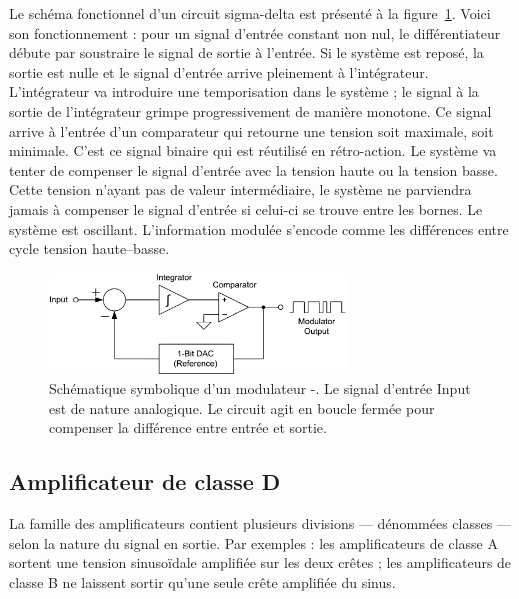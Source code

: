 \documentclass[10pt, oneside, a4paper]{article}
\begin{document}
Le schéma fonctionnel d'un circuit sigma-delta est présenté à la figure~\ref{fig:sigmaDelta}.
Voici son fonctionnement :
pour un signal d'entrée constant non nul, le différentiateur débute par soustraire le signal de sortie à l'entrée.
Si le système est reposé, la sortie est nulle et le signal d'entrée arrive pleinement à l'intégrateur.
L'intégrateur va introduire une temporisation dans le système ;
le signal à la sortie de l'intégrateur grimpe progressivement de manière monotone.
Ce signal arrive à l'entrée d'un comparateur qui retourne une tension soit maximale, soit minimale.
C'est ce signal binaire qui est réutilisé en rétro-action.
Le système va tenter de compenser le signal d'entrée avec la tension haute ou la tension basse.
Cette tension n'ayant pas de valeur intermédiaire, le système ne parviendra jamais à compenser le signal d'entrée si celui-ci se trouve entre les bornes.
Le système est oscillant.
L'information modulée s'encode comme les différences entre cycle tension haute--basse.

\begin{figure}[htbp]
    \centering
    \includegraphics[width=0.7\textwidth]{eps/sigma-delta.eps}
    \caption{Schématique symbolique d'un modulateur \Sigma{}-\Delta{}.
    Le signal d'entrée \og{}Input\fg{} est de nature analogique.
    Le circuit agit en boucle fermée pour compenser la différence entre entrée et sortie.}
    \label{fig:sigmaDelta}
\end{figure}

\subsection{Amplificateur de classe D}
\label{sec:classeD}
La famille des amplificateurs contient plusieurs divisions --- dénommées \og{}classes\fg{} --- selon la nature du signal en sortie.
Par exemples :
les amplificateurs de classe A sortent une tension sinusoïdale amplifiée sur les deux crêtes ;
les amplificateurs de classe B ne laissent sortir qu'une seule crête amplifiée du sinus.
\end{document}
